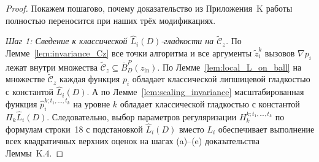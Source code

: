 \documentclass[11pt, a4paper]{article}
\theoremstyle{definition}
\begin{document}
\begin{proof}
Покажем пошагово, почему доказательство из Приложения~K работы~\cite{Borodich2025} полностью переносится при наших трёх модификациях.

\emph{Шаг 1: Сведение к классической $\widehat{L}_i(D)$-гладкости на $\widetilde{\mathcal{C}}_z$.} По Лемме~\ref{lem:invariance_Cz} все точки алгоритма и все аргументы $\tilde{z}_i^k$ вызовов $\nabla p_i$ лежат внутри множества $\widetilde{\mathcal{C}}_z \subseteq \overline{B}_D^P(z_{\mathrm{in}})$. По Лемме~\ref{lem:local_L_on_ball} на множестве $\widetilde{\mathcal{C}}_z$ каждая функция $p_i$ обладает классической липшицевой гладкостью с константой $\widehat{L}_i(D)$. А по Лемме~\ref{lem:scaling_invariance} масштабированная функция $\hat{p}_i^{k; t_1, \dots, t_k}$ на уровне $k$ обладает классической гладкостью с константой $\Pi_k \widehat{L}_i(D)$. Следовательно, выбор параметров регуляризации $H_k^{k; t_1, \dots, t_k}$ по формулам строки~18 с подстановкой $\widehat{L}_i(D)$ вместо $L_i$ обеспечивает выполнение всех квадратичных верхних оценок на шагах (a)--(e) доказательства Леммы~K.4.


\end{proof}
\end{document}
